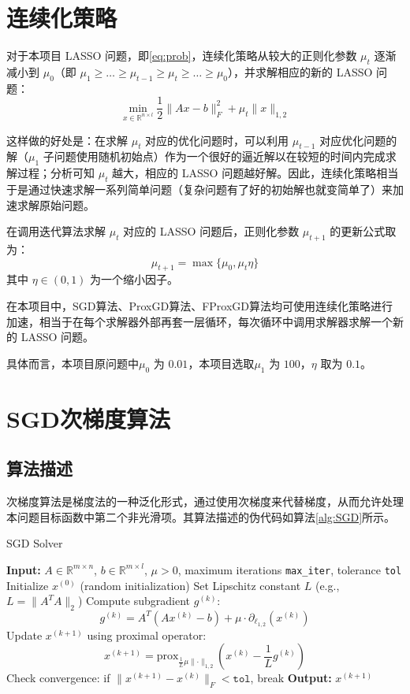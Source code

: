 \documentclass[journal, a4paper]{IEEEtran}
\begin{document}
\section{\textbf{连续化策略}}

对于本项目 LASSO 问题，即\ref{eq:prob}，连续化策略从较大的正则化参数 $\mu_t$ 逐渐减小到 $\mu_0$（即 $\mu_1 \geq \ldots \geq \mu_{t-1} \geq \mu_t \geq \ldots \geq \mu_0$），并求解相应的新的 LASSO 问题：
\begin{equation}\label{eq:prob-mut}
    \min _{x \in \mathbb{R}^{n \times l}} \frac{1}{2}\|A x-b\|_F^2+\mu_{t}\|x\|_{1,2}
\end{equation}

这样做的好处是：在求解 $\mu_t$ 对应的优化问题时，可以利用 $\mu_{t-1}$ 对应优化问题的解（$\mu_1$ 子问题使用随机初始点）作为一个很好的逼近解以在较短的时间内完成求解过程；分析可知 $\mu_t$ 越大，相应的 LASSO 问题越好解\cite{LASSO_con}。因此，连续化策略相当于是通过快速求解一系列简单问题（复杂问题有了好的初始解也就变简单了）来加速求解原始问题。

在调用迭代算法求解 $\mu_t$ 对应的 LASSO 问题后，正则化参数 $\mu_{t+1}$ 的更新公式取为：
$$
\mu_{t+1} = \max\{\mu_0, \mu_t \eta\}
$$
其中 $\eta \in (0,1)$ 为一个缩小因子。

在本项目中，SGD算法、ProxGD算法、FProxGD算法均可使用连续化策略进行加速，相当于在每个求解器外部再套一层循环，每次循环中调用求解器求解一个新的 LASSO 问题。

具体而言，本项目原问题中$\mu_0$ 为 $0.01$，本项目选取$\mu_1$ 为 $100$，$\eta$ 取为 $0.1$。

\section{\textbf{SGD次梯度算法}}

\subsection{\textbf{算法描述}}
次梯度算法是梯度法的一种泛化形式，通过使用次梯度来代替梯度，从而允许处理本问题目标函数中第二个非光滑项。其算法描述的伪代码如算法\ref{alg:SGD}所示。

\begin{algorithm}
    \caption{SGD Solver}
    \label{alg:SGD}
    \begin{algorithmic}[1]
    \State \textbf{Input:} $A \in \mathbb{R}^{m \times n}$, $b \in \mathbb{R}^{m \times l}$, $\mu > 0$, maximum iterations \texttt{max\_iter}, tolerance \texttt{tol}
    \State Initialize $x^{(0)}$ (random initialization)
    \State Set Lipschitz constant $L$ (e.g., $L = \lVert A^TA \rVert_2$)
        \State Compute subgradient $g^{(k)}$:
        \[
        g^{(k)} = A^T(Ax^{(k)} - b) + \mu \cdot \partial_{\ell_{1,2}}(x^{(k)})
        \]
        \State Update $x^{(k+1)}$ using proximal operator:
        \[
        x^{(k+1)} = \text{prox}_{\frac{1}{L}\mu\lVert \cdot \rVert_{1,2}}\left(x^{(k)} - \frac{1}{L} g^{(k)}\right)
        \]
        \State Check convergence: if $\lVert x^{(k+1)} - x^{(k)} \rVert_F < \texttt{tol}$, break
    \EndFor
    \State \textbf{Output:} $x^{(k+1)}$
    \end{algorithmic}
\end{algorithm}
\end{document}
